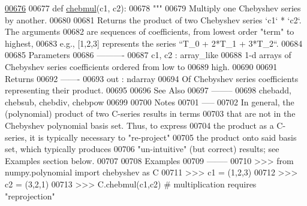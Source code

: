 \begin{DoxyCode}
\hypertarget{namespacepyneb_1_1utils_1_1chebyshev_l00676}{}\hyperlink{namespacepyneb_1_1utils_1_1chebyshev_a20beb101adf242958f21dff04591e1ca}{00676} 
00677 \textcolor{keyword}{def }\hyperlink{namespacepyneb_1_1utils_1_1chebyshev_a20beb101adf242958f21dff04591e1ca}{chebmul}(c1, c2):
00678     \textcolor{stringliteral}{"""}
00679 \textcolor{stringliteral}{    Multiply one Chebyshev series by another.}
00680 \textcolor{stringliteral}{}
00681 \textcolor{stringliteral}{    Returns the product of two Chebyshev series `c1` * `c2`.  The arguments}
00682 \textcolor{stringliteral}{    are sequences of coefficients, from lowest order "term" to highest,}
00683 \textcolor{stringliteral}{    e.g., [1,2,3] represents the series ``T\_0 + 2*T\_1 + 3*T\_2``.}
00684 \textcolor{stringliteral}{}
00685 \textcolor{stringliteral}{    Parameters}
00686 \textcolor{stringliteral}{    ----------}
00687 \textcolor{stringliteral}{    c1, c2 : array\_like}
00688 \textcolor{stringliteral}{        1-d arrays of Chebyshev series coefficients ordered from low to}
00689 \textcolor{stringliteral}{        high.}
00690 \textcolor{stringliteral}{}
00691 \textcolor{stringliteral}{    Returns}
00692 \textcolor{stringliteral}{    -------}
00693 \textcolor{stringliteral}{    out : ndarray}
00694 \textcolor{stringliteral}{        Of Chebyshev series coefficients representing their product.}
00695 \textcolor{stringliteral}{}
00696 \textcolor{stringliteral}{    See Also}
00697 \textcolor{stringliteral}{    --------}
00698 \textcolor{stringliteral}{    chebadd, chebsub, chebdiv, chebpow}
00699 \textcolor{stringliteral}{}
00700 \textcolor{stringliteral}{    Notes}
00701 \textcolor{stringliteral}{    -----}
00702 \textcolor{stringliteral}{    In general, the (polynomial) product of two C-series results in terms}
00703 \textcolor{stringliteral}{    that are not in the Chebyshev polynomial basis set.  Thus, to express}
00704 \textcolor{stringliteral}{    the product as a C-series, it is typically necessary to "re-project"}
00705 \textcolor{stringliteral}{    the product onto said basis set, which typically produces}
00706 \textcolor{stringliteral}{    "un-intuitive" (but correct) results; see Examples section below.}
00707 \textcolor{stringliteral}{}
00708 \textcolor{stringliteral}{    Examples}
00709 \textcolor{stringliteral}{    --------}
00710 \textcolor{stringliteral}{    >>> from numpy.polynomial import chebyshev as C}
00711 \textcolor{stringliteral}{    >>> c1 = (1,2,3)}
00712 \textcolor{stringliteral}{    >>> c2 = (3,2,1)}
00713 \textcolor{stringliteral}{    >>> C.chebmul(c1,c2) # multiplication requires "reprojection"}

\end{DoxyCode}
